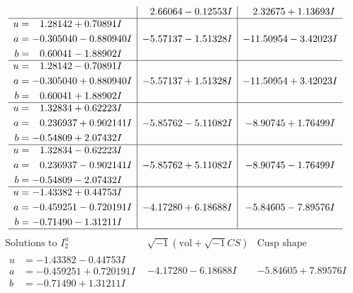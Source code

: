 \documentclass[1p]{elsarticle_modified}
\theoremstyle{definition}
\newcommand{\I}{\sqrt{-1}}
\begin{document}
$$\begin{array}{c|c|c}
 & \phantom{-}2.66064 - 0.12553 I & \phantom{-}2.32675 + 1.13693 I \\ \hline\begin{aligned}
u &= \phantom{-}1.28142 + 0.70891 I \\
a &= -0.305040 - 0.880940 I \\
b &= \phantom{-}0.60041 - 1.88902 I\end{aligned}
 & -5.57137 - 1.51328 I & -11.50954 - 3.42023 I \\ \hline\begin{aligned}
u &= \phantom{-}1.28142 - 0.70891 I \\
a &= -0.305040 + 0.880940 I \\
b &= \phantom{-}0.60041 + 1.88902 I\end{aligned}
 & -5.57137 + 1.51328 I & -11.50954 + 3.42023 I \\ \hline\begin{aligned}
u &= \phantom{-}1.32834 + 0.62223 I \\
a &= \phantom{-}0.236937 + 0.902141 I \\
b &= -0.54809 + 2.07432 I\end{aligned}
 & -5.85762 - 5.11082 I & -8.90745 + 1.76499 I \\ \hline\begin{aligned}
u &= \phantom{-}1.32834 - 0.62223 I \\
a &= \phantom{-}0.236937 - 0.902141 I \\
b &= -0.54809 - 2.07432 I\end{aligned}
 & -5.85762 + 5.11082 I & -8.90745 - 1.76499 I \\ \hline\begin{aligned}
u &= -1.43382 + 0.44753 I \\
a &= -0.459251 - 0.720191 I \\
b &= -0.71490 - 1.31211 I\end{aligned}
 & -4.17280 + 6.18688 I & -5.84605 - 7.89576 I\\
 \hline 
 \end{array}$$\newpage$$\begin{array}{c|c|c}  
\text{Solutions to }I^u_{2}& \I (\text{vol} + \sqrt{-1}CS) & \text{Cusp shape}\\
 \hline 
\begin{aligned}
u &= -1.43382 - 0.44753 I \\
a &= -0.459251 + 0.720191 I \\
b &= -0.71490 + 1.31211 I\end{aligned}
 & -4.17280 - 6.18688 I & -5.84605 + 7.89576 I \\ \hline\begin{aligned}

\end{aligned}
\end{array}$$
\end{document}

